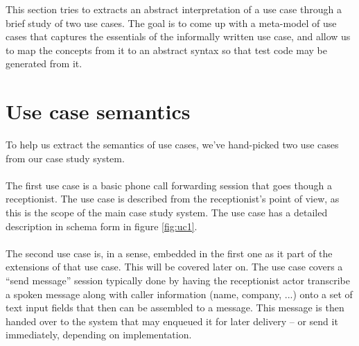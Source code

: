 
This section tries to extracts an abstract interpretation of a use case through a brief study of two use cases. The goal is to come up with a meta-model of use cases that captures the essentials of the informally written use case, and allow us to map the concepts from it to an abstract syntax so that test code may be generated from it.
\section{Use case semantics}
To help us extract the semantics of use cases, we've hand-picked two use cases from our case study system.\\\\
The first use case is a basic phone call forwarding session that goes though a receptionist. The use case is described from the receptionist's point of view, as this is the scope of the main case study system. The use case has a detailed description in schema form in figure \ref{fig:uc1}. \\\\
The second use case is, in a sense, embedded in the first one as it part of the extensions of that use case. This will be covered later on. The use case covers a ``send message'' session typically done by having the receptionist actor transcribe a spoken message along with caller information (name, company, ...) onto a set of text input fields that then can be assembled to a message. This message is then handed over to the system that may enqueued it for later delivery -- or send it immediately, depending on implementation.

